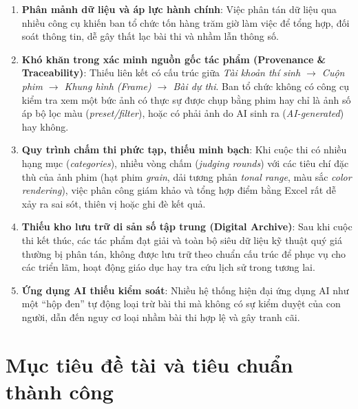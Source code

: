 \begin{enumerate}
    \item \textbf{Phân mảnh dữ liệu và áp lực hành chính}: Việc phân tán dữ liệu qua nhiều công cụ khiến ban tổ chức tốn hàng trăm giờ làm việc để tổng hợp, đối soát thông tin, dễ gây thất lạc bài thi và nhầm lẫn thông số.
    \item \textbf{Khó khăn trong xác minh nguồn gốc tác phẩm (Provenance \& Traceability)}: Thiếu liên kết có cấu trúc giữa \textit{Tài khoản thí sinh $\rightarrow$ Cuộn phim $\rightarrow$ Khung hình (Frame) $\rightarrow$ Bài dự thi}. Ban tổ chức không có công cụ kiểm tra xem một bức ảnh có thực sự được chụp bằng phim hay chỉ là ảnh số áp bộ lọc màu (\textit{preset/filter}), hoặc có phải ảnh do AI sinh ra (\textit{AI-generated}) hay không.
    \item \textbf{Quy trình chấm thi phức tạp, thiếu minh bạch}: Khi cuộc thi có nhiều hạng mục (\textit{categories}), nhiều vòng chấm (\textit{judging rounds}) với các tiêu chí đặc thù của ảnh phim (hạt phim \textit{grain}, dải tương phản \textit{tonal range}, màu sắc \textit{color rendering}), việc phân công giám khảo và tổng hợp điểm bằng Excel rất dễ xảy ra sai sót, thiên vị hoặc ghi đè kết quả.
    \item \textbf{Thiếu kho lưu trữ di sản số tập trung (Digital Archive)}: Sau khi cuộc thi kết thúc, các tác phẩm đạt giải và toàn bộ siêu dữ liệu kỹ thuật quý giá thường bị phân tán, không được lưu trữ theo chuẩn cấu trúc để phục vụ cho các triển lãm, hoạt động giáo dục hay tra cứu lịch sử trong tương lai.
    \item \textbf{Ứng dụng AI thiếu kiểm soát}: Nhiều hệ thống hiện đại ứng dụng AI như một ``hộp đen'' tự động loại trừ bài thi mà không có sự kiểm duyệt của con người, dẫn đến nguy cơ loại nhầm bài thi hợp lệ và gây tranh cãi.
\end{enumerate}

\section{Mục tiêu đề tài và tiêu chuẩn thành công}
\label{s:c1_objectives}

